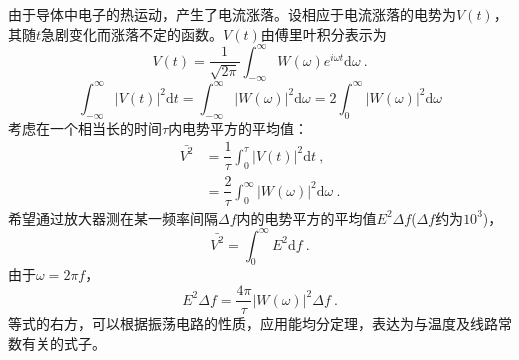 \documentclass[11pt,a4paper]{article}
\newcommand{\dif}{\mathrm{d}}
\begin{document}
\cite{wangzhuxi1965} 由于导体中电子的热运动，产生了电流涨落。设相应于电流涨落的电势为$V(t)$，其随$t$急剧变化而涨落不定的函数。$V(t)$由傅里叶积分表示为
\begin{equation}
V(t) = \dfrac{1}{\sqrt{2\pi}} \int_{-\infty}^\infty W(\omega) e^{i\omega t} \dif \omega ~.
\end{equation}
\begin{equation}
\int_{-\infty}^\infty |V(t)|^2 \dif t = \int_{-\infty}^\infty |W(\omega)|^2 \dif \omega = 2 \int_0^\infty |W(\omega)|^2 \dif \omega
\end{equation}
考虑在一个相当长的时间$\tau$内电势平方的平均值：
\begin{align}
\bar{V^2} &= \dfrac{1}{\tau} \int_0^\tau |V(t)|^2 \dif t ~, \\
&= \dfrac{2}{\tau} \int_0^\infty |W(\omega)|^2 \dif \omega ~.
\end{align}
希望通过放大器测在某一频率间隔$\Delta f$内的电势平方的平均值$E^2 \Delta f$($\Delta f$约为$10^3$)，
\begin{equation}
\bar{V^2} = \int_0^\infty E^2 \dif f ~.
\end{equation}
由于$\omega = 2\pi f$，
\begin{equation}
E^2 \Delta f = \dfrac{4\pi}{\tau} |W(\omega)|^2 \Delta f ~.
\end{equation}
等式的右方，可以根据振荡电路的性质，应用能均分定理，表达为与温度及线路常数有关的式子。
\end{document}
